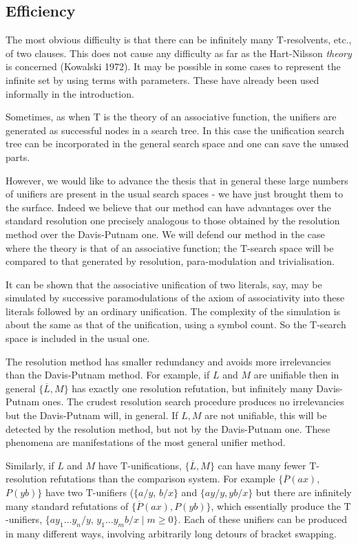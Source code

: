 \documentclass[letterpaper]{report}
\begin{document}
\subsection*{Efficiency}\label{efficiency}

The most obvious difficulty is that there can be infinitely many
$\mathrm{T}$-resolvents, etc., of two clauses. This does not cause any difficulty
as far as the Hart-Nilsson \emph{theory} is concerned (Kowalski 1972).
It may be possible in some cases to represent the infinite set by using
terms with parameters. These have already been used informally in the
introduction.

Sometimes, as when T is the theory of an associative function, the
unifiers are generated as successful nodes in a search tree. In this
case the unification search tree can be incorporated in the general
search space and one can save the unused parts.

However, we would like to advance the thesis that in general these large
numbers of unifiers are present in the usual search spaces - we have
just brought them to the surface. Indeed we believe that our method can
have advantages over the standard resolution one precisely analogous to
those obtained by the resolution method over the Davis-Putnam one. We
will defend our method in the case where the theory is that of an
associative function; the $\mathrm{T}$-search space will be compared to that
generated by resolution, para-modulation and trivialisation.

It can be shown that the associative unification of two literals, say,
may be simulated by successive paramodulations of the axiom of
associativity into these literals followed by an ordinary unification.
The complexity of the simulation is about the same as that of the
unification, using a symbol count. So the $\mathrm{T}$-search space is included in
the usual one.

The resolution method has smaller redundancy and avoids more
irrelevancies than the Davis-Putnam method. For example, if $L$ and
$M$ are unifiable then in general $\{\overline{L}, M\}$ has exactly
one resolution refutation, but infinitely many Davis-Putnam ones. The
crudest resolution search procedure produces no irrelevancies but the
Davis-Putnam will, in general. If $L, M$ are not unifiable, this will
be detected by the resolution method, but not by the Davis-Putnam one.
These phenomena are manifestations of the most general unifier method.

Similarly, if $L$ and $M$ have $\mathrm{T}$-unifications,
$\{\overline{L},M\}$ can have many fewer $\mathrm{T}$-resolution refutations than
the comparison system. For example $\{\overline{P}\left(ax\right)$,
$P\left(yb\right)\}$ have two $\mathrm{T}$-unifiers ($\{a/y$, $b/x\}$ and
$\{ay/y,yb/x\}$ but there are infinitely many standard refutations of
$\{\overline{P}\left(ax\right),P\left(yb\right)\}$, which essentially
produce the $\mathrm{T}$-unifiers, $\{ay_{1}\ldots y_{n}/y$,
$y_{1}\ldots y_{m}b/x \mid m$$\geqslant$$0\}$. Each of these
unifiers can be produced in many different ways, involving arbitrarily
long detours of bracket swapping.
\end{document}
